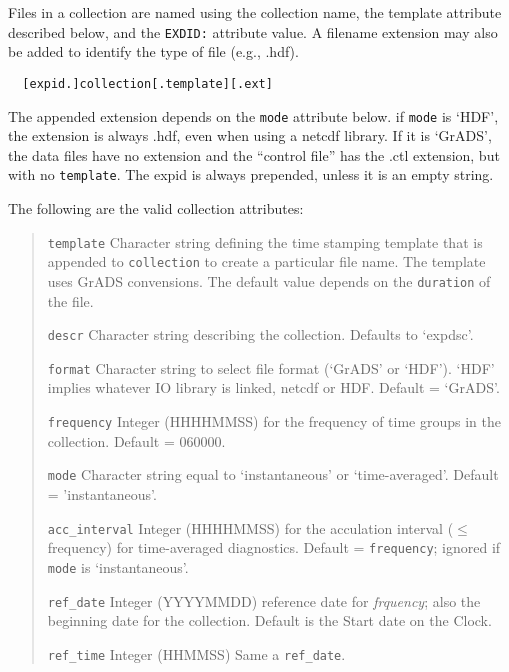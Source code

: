 Files in a collection are named using the collection name, the template attribute
described below, 
and the {\tt EXDID:} attribute value. A filename extension may also be added to identify the
type of file (e.g., .hdf).
\begin{verbatim}
  [expid.]collection[.template][.ext]
\end{verbatim}
The appended extension depends on the {\tt mode} attribute below. if {\tt mode} is `HDF', 
 the extension is always .hdf, even when using a netcdf library. If it is `GrADS', the 
 data files have no extension and the ``control file'' has the .ctl extension, but with no
 {\tt template}. The expid is always prepended, unless it is an empty string.

 The following are the valid collection attributes:
 \begin{quote}
 \begin{trivlist}
 \item[\tt template]      Character string defining the time stamping template that is appended 
                          to {\tt collection} to create a particular file name. 
                          The template uses GrADS convensions. 
                          The default value depends on the {\tt duration} of the file.
 \item[\tt descr]         Character string describing the collection. Defaults to `expdsc'.
 \item[\tt format]        Character string to select file format (`GrADS' or `HDF').  `HDF' 
                          implies whatever IO library is linked, netcdf or HDF.
                          Default = `GrADS'.
 \item[\tt frequency]     Integer (HHHHMMSS) for the frequency of time groups in the collection.
                          Default = 060000.
 \item[\tt mode]          Character string equal to `instantaneous' or `time-averaged'.
                          Default = 'instantaneous'.
 \item[\tt acc\_interval] Integer (HHHHMMSS) for the acculation interval ($\le$ frequency)
                          for time-averaged diagnostics. Default = {\tt frequency}; ignored
                          if {\tt mode} is `instantaneous'.
 \item[\tt ref\_date]     Integer (YYYYMMDD) reference date for {\em frquency};
                          also the beginning date for
                          the collection. Default is the Start date on the Clock.
 \item[\tt ref\_time]     Integer (HHMMSS) Same a {\tt ref\_date}.

\end{trivlist}
\end{quote}
